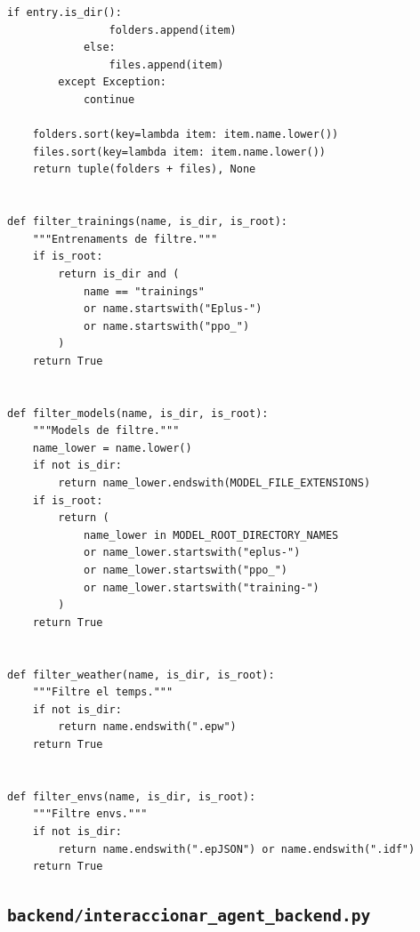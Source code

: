 \documentclass[10pt,a4paper]{article}
\begin{document}
\begin{lstlisting}[style=studioPython,caption={backend/gestionar\_arxius\_backend.py},label={lst:backend-gestionar-arxius-backend-py}]
            if entry.is_dir():
                folders.append(item)
            else:
                files.append(item)
        except Exception:
            continue

    folders.sort(key=lambda item: item.name.lower())
    files.sort(key=lambda item: item.name.lower())
    return tuple(folders + files), None


def filter_trainings(name, is_dir, is_root):
    """Entrenaments de filtre."""
    if is_root:
        return is_dir and (
            name == "trainings"
            or name.startswith("Eplus-")
            or name.startswith("ppo_")
        )
    return True


def filter_models(name, is_dir, is_root):
    """Models de filtre."""
    name_lower = name.lower()
    if not is_dir:
        return name_lower.endswith(MODEL_FILE_EXTENSIONS)
    if is_root:
        return (
            name_lower in MODEL_ROOT_DIRECTORY_NAMES
            or name_lower.startswith("eplus-")
            or name_lower.startswith("ppo_")
            or name_lower.startswith("training-")
        )
    return True


def filter_weather(name, is_dir, is_root):
    """Filtre el temps."""
    if not is_dir:
        return name.endswith(".epw")
    return True


def filter_envs(name, is_dir, is_root):
    """Filtre envs."""
    if not is_dir:
        return name.endswith(".epJSON") or name.endswith(".idf")
    return True
\end{lstlisting}


\subsection{\texorpdfstring{\texttt{backend/interaccionar\_agent\_backend.py}}{backend/interaccionar\_agent\_backend.py}}
\end{document}
